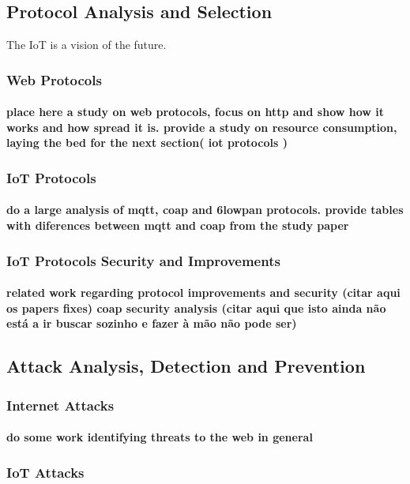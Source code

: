 \subsection{Protocol Analysis and Selection}

The \ac{IoT} is a vision of the future.



\subsubsection{Web Protocols}

\paragraph{
place here a study on web protocols, focus on http and show how it works and how spread it is.
provide a study on resource consumption, laying the bed for the next section( iot protocols )
}

\subsubsection{IoT Protocols}
\paragraph{
do a large analysis of mqtt, coap and 6lowpan protocols. provide tables with diferences between mqtt and coap from the study paper \cite{Ma2014}
}
\subsubsection{IoT Protocols Security and Improvements}
\paragraph{
related work regarding protocol improvements and security (citar aqui os papers fixes)
coap security analysis (citar aqui que isto ainda não está a ir buscar sozinho e fazer à mão não pode ser)
}

\subsection{Attack Analysis, Detection and Prevention}

\subsubsection{Internet Attacks}
\paragraph{
do some work identifying threats to the web in general
}
\subsubsection{IoT Attacks}
